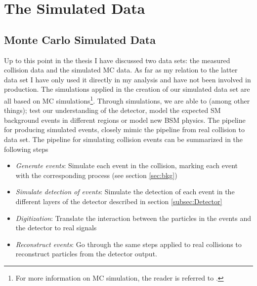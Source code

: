\section{The Simulated Data}
\subsection{Monte Carlo Simulated Data}
Up to this point in the thesis I have discussed two data sets: the measured collision data and the simulated \ac{MC} data. 
As far as my relation to the latter data set I have only used it directly in my analysis and have not been involved in 
production. The simulations applied in the creation of our simulated data set are all based on \acf{MC} simulations\footnote{For 
more information on \ac{MC} simulation, the reader is referred to \cite{raychaudhuri_introduction_2008}.}.
Through simulations, we are able to (among other things); test our understanding of the detector, model the expected \ac{SM} background 
events in different regions or model new \ac{BSM} physics. The pipeline for producing simulated events, closely mimic the pipeline 
from real collision to data set. The pipeline for simulating collision events can be summarized in the following steps
\begin{itemize}
  \item \emph{Generate events}: Simulate each event in the collision, marking each event with the corresponding process (see section \ref{sec:bkg})
  \item \emph{Simulate detection of events}: Simulate the detection of each event in the different layers of the detector described in section \ref{subsec:Detector}
  \item \emph{Digitization}: Translate the interaction between the particles in the events and the detector to real signals
  \item \emph{Reconstruct events}: Go through the same steps applied to real collisions to reconstruct particles from the detector output.
\end{itemize}
